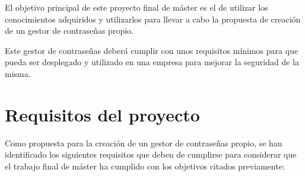 \documentclass{\ClassPath/viu-tfm-template}
\begin{document}
El objetivo principal de este proyecto final de máster es el de utilizar los conocimientos adquiridos y utilizarlos para llevar a cabo la propuesta de creación de un gestor de contraseñas propio.

Este gestor de contraseñas deberá cumplir con unos requisitos mínimos para que pueda ser desplegado y utilizado en una empresa para mejorar la seguridad de la misma.


\section{Requisitos del proyecto}
Como propuesta para la creación de un gestor de contraseñas propio, se han identificado los siguientes requisitos que deben de cumplirse para considerar que el trabajo final de máster ha cumplido con los objetivos citados previamente:
\end{document}
